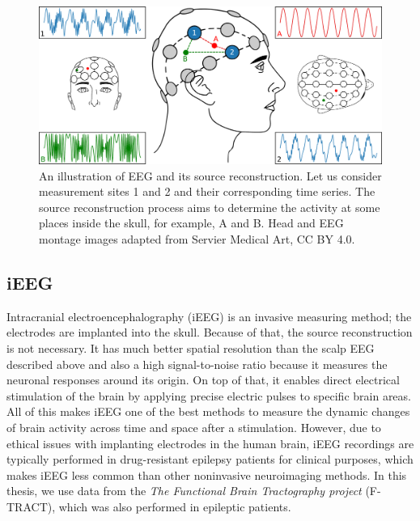\begin{figure}
  \begin{center}
    \includegraphics[width=\textwidth]{images/brain/EEG_source_reconstruction.png.pdf}
  \end{center}
  \caption[An artistic illustration of EEG and its source reconstruction]{An illustration of EEG and its source reconstruction. Let us consider measurement sites 1 and 2 and their corresponding time series. The source reconstruction process aims to determine the activity at some places inside the skull, for example, A and B. Head and EEG montage images adapted from Servier Medical Art, CC BY 4.0.}
  \label{fig:EEG}
\end{figure}

\subsection{iEEG}

Intracranial electroencephalography (iEEG) is an invasive measuring method; the electrodes are implanted into the skull. Because of that, the source reconstruction is not necessary. It has much better spatial resolution than the scalp EEG described above and also a high signal-to-noise ratio because it measures the neuronal responses around its origin. On top of that, it enables direct electrical stimulation of the brain by applying precise electric pulses to specific brain areas.
All of this makes iEEG one of the best methods to measure the dynamic changes of brain activity across time and space after a stimulation. However, due to ethical issues with implanting electrodes in the human brain, iEEG recordings are typically performed in drug-resistant epilepsy patients for clinical purposes, which makes iEEG less common than other noninvasive neuroimaging methods. In this thesis, we use data from the \textit{The Functional Brain Tractography project} (F-TRACT), which was also performed in epileptic patients. \cite{axmacher_what_2023,seguin_communication_2023}

